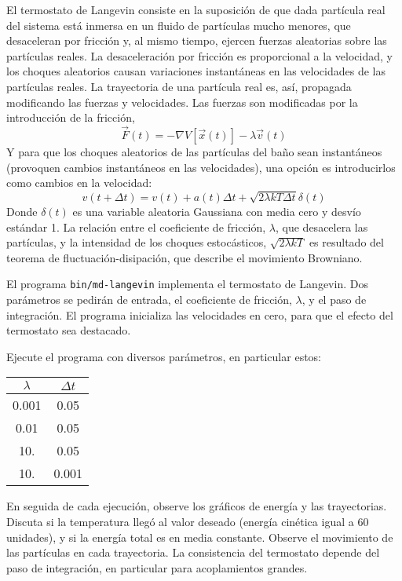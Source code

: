 \documentclass[10pt,a4paper,ssfamily]{exam}
\newcommand{\1}{{\bf 1}}
\newcommand{\2}{{\bf 2}}
\newcommand{\3}{{\bf 3}}
\begin{document}
El termostato de Langevin consiste en la suposición de que dada
partícula real del sistema está inmersa en un fluido de partículas mucho
menores, que desaceleran por fricción y, al mismo tiempo,
ejercen fuerzas aleatorias sobre las partículas reales. La
desaceleración por fricción es proporcional a la velocidad, y los
choques aleatorios causan variaciones instantáneas en las velocidades de
las partículas reales. La trayectoria de una partícula real es, así,
propagada modificando las fuerzas y velocidades. Las fuerzas son
modificadas por la introducción de la fricción,
\[
\vec{F}(t) = -\nabla V[\vec{x}(t)] - \lambda \vec{v}(t)
\]
Y para que los choques aleatorios de las partículas del baño sean
instantáneos (provoquen cambios instantáneos en las velocidades), una
opción es introducirlos como cambios en la velocidad:
\[
v(t+\Delta t) = v(t) + a(t)\Delta t 
+ \sqrt{2\lambda kT \Delta t}\delta(t)
\] 
Donde $\delta(t)$ es una variable aleatoria Gaussiana con media cero y
desvío estándar 1. La relación entre el coeficiente de fricción, $\lambda$,
que desacelera las partículas, y la intensidad de los choques
estocásticos, $\sqrt{2\lambda kT}$ es resultado del teorema de
fluctuación-disipación, que describe el movimiento Browniano.

El programa {\tt bin/md-langevin} implementa el termostato de Langevin.
Dos parámetros se pedirán de entrada, el coeficiente de fricción,
$\lambda$, y el paso de integración. El programa inicializa las velocidades
en cero, para que el efecto del termostato sea destacado.

Ejecute el programa con diversos parámetros, en particular estos:

{\tt \begin{center}\begin{tabular}{cc}
\hline
 $\lambda$ & $\Delta t$ \\
\hline
0.001 & 0.05 \\
0.01  & 0.05 \\
10.   & 0.05 \\
10.   & 0.001 \\
\hline
\end{tabular}\end{center}}

En seguida de cada ejecución, observe los gráficos de energía y las
trayectorias. Discuta si la temperatura llegó al valor deseado (energía
cinética igual a 60 unidades), y si la energía total es en media
constante. Observe el movimiento de las partículas en cada trayectoria. 
La consistencia del termostato depende del paso de integración, en
particular para acoplamientos grandes.  
\end{document}

